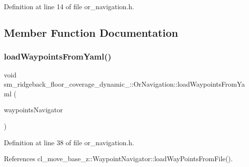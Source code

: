 Definition at line 14 of file or\+\_\+navigation.\+h.



\subsection{Member Function Documentation}
\mbox{\label{classsm__ridgeback__floor__coverage__dynamic__1_1_1OrNavigation_a4aa48f8ae2e850900e06ea10b472d6cf}} 
\subsubsection{\texorpdfstring{load\+Waypoints\+From\+Yaml()}{loadWaypointsFromYaml()}}
{\footnotesize\ttfamily void sm\+\_\+ridgeback\+\_\+floor\+\_\+coverage\+\_\+dynamic\+\_\+::\+Or\+Navigation\+::load\+Waypoints\+From\+Yaml (\begin{DoxyParamCaption}\item[{\hyperlink{classcl__move__base__z_1_1WaypointNavigator}{Waypoint\+Navigator} $\ast$}]{waypoints\+Navigator }\end{DoxyParamCaption})\hspace{0.3cm}{\ttfamily [inline]}}



Definition at line 38 of file or\+\_\+navigation.\+h.



References cl\+\_\+move\+\_\+base\+\_\+z\+::\+Waypoint\+Navigator\+::load\+Way\+Points\+From\+File().


